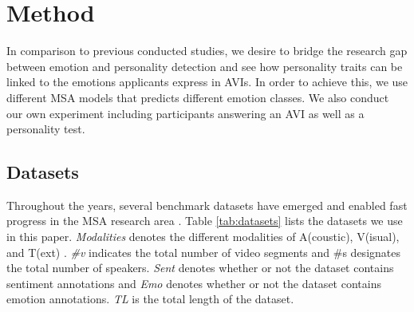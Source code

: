 \chapter{Method}
In comparison to previous conducted studies, we desire to bridge the research gap between emotion and personality detection and see how personality traits can be linked to the emotions applicants express in AVIs. In order to achieve this, we use different MSA models that predicts different emotion classes. We also conduct our own experiment including participants answering an AVI as well as a personality test. 



\section{Datasets}
Throughout the years, several benchmark datasets have emerged and enabled fast progress in the MSA research area \cite{COGMEN_joshi-etal-2022-cogmen}.  Table \ref{tab:datasets} lists the datasets we use in this paper. \textit{Modalities} denotes the different modalities of A(coustic), V(isual), and T(ext) \cite{HP_RPP}. \textit{\#v} indicates the total number of video segments and \#s designates the total number of speakers. \textit{Sent} denotes whether or not the dataset contains sentiment annotations and \textit{Emo} denotes whether or not the dataset contains emotion annotations. \textit{TL} is the total length of the dataset. 
%
\begin{table}[h]
\caption{Benchmark MSA datasets}
\centering
{}
\label{tab:datasets}
\end{table}

